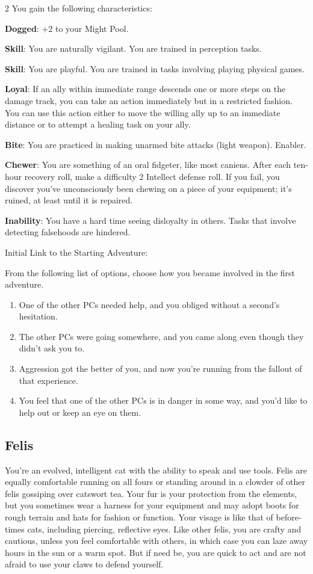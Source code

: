 \begin{multicols}{2}
You gain the following characteristics:

\textbf{Dogged}: +2 to your Might Pool.

\textbf{Skill}: You are naturally vigilant. You are trained in perception tasks.

\textbf{Skill}: You are playful. You are trained in tasks involving playing physical games.

\textbf{Loyal}: If an ally within immediate range descends one or more steps on the damage 
track, you can take an action immediately but in a restricted fashion. You can use this  action either to move the willing ally up to an immediate distance or to attempt a  healing task on your ally.

\textbf{Bite}: You are practiced in making unarmed bite attacks (light weapon). Enabler.

\textbf{Chewer}: You are something of an oral fidgeter, like most caniens. After each ten-hour recovery roll, make a difficulty 2 Intellect defense roll. If you fail, you discover you’ve unconsciously been chewing on a piece of your equipment; it’s ruined, at least until it is repaired.

\textbf{Inability}: You have a hard time seeing disloyalty in others. Tasks that involve detecting falsehoods are hindered.

Initial Link to the Starting Adventure:

From the following list of options, choose how you became involved in the first 
adventure.
\begin{enumerate}
\item  One of the other PCs needed help, and you obliged without a second’s hesitation.
\item  The other PCs were going somewhere, and you came along even though they didn’t ask you to.
\item  Aggression got the better of you, and now you’re running from the fallout of that experience.
\item  You feel that one of the other PCs is in danger in some way, and you’d like to help 
out or keep an eye on them.
\end{enumerate}

\subsection{Felis}

You’re an evolved, intelligent cat with the ability to speak and use tools. Felis are equally comfortable running on all fours or standing around in a clowder of other felis gossiping over catswort tea. Your fur is your protection from the elements, but you sometimes wear a harness for your equipment and may adopt boots for rough terrain and hats for fashion or function. Your visage is like that of before-times cats, including piercing, reflective eyes. Like other felis, you are crafty and cautious, unless you feel comfortable with others, in which case you can laze away hours in the sun or a warm spot. But if need be, you are quick to act and are not afraid to use your claws to defend yourself.


\end{multicols}
